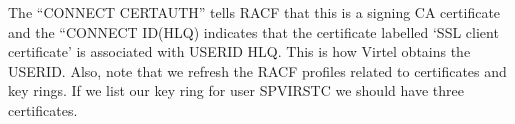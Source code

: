 \documentclass[letterpaper,10pt,english]{sphinxmanual}
\begin{document}
The “CONNECT CERTAUTH” tells RACF that this is a signing CA certificate and the “CONNECT ID(HLQ) indicates that the certificate labelled ‘SSL client certificate’ is associated with USERID HLQ. This is how Virtel obtains the USERID. Also, note that we refresh the RACF profiles related to certificates and key rings. If we list our key ring for user SPVIRSTC we should have three certificates.

\begin{sphinxVerbatim}[commandchars=\\\{\}]
  
     
                              
            
                               
                          
                         
\end{sphinxVerbatim}
\end{document}
